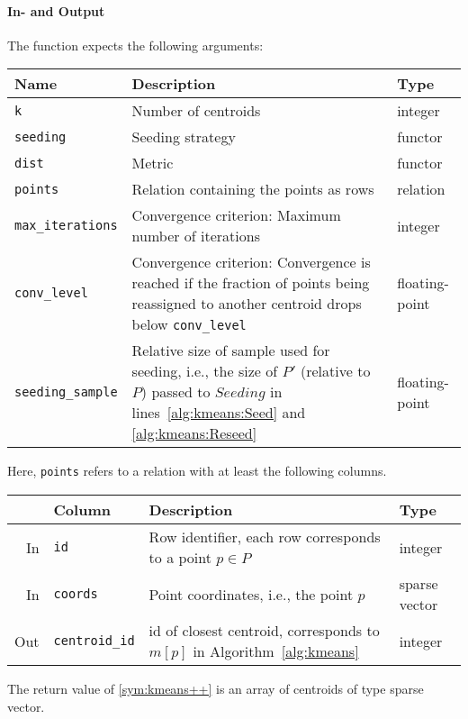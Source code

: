 \documentclass[letterpaper,11pt]{scrreprt}
\numberwithin{equation}{section}
\newcommand{\otoprule}{\midrule[\heavyrulewidth]}
\theoremstyle{algorithm}
\begin{document}
\paragraph{In- and Output} The function expects the following arguments:

\begin{center}
	\begin{tabularx}{\linewidth}{lXl}
		\toprule%
		\textbf{Name} & \textbf{Description} & \textbf{Type}
		\\\otoprule
		\texttt{k} &
		Number of centroids &
		integer
		\\\midrule
		\texttt{seeding} &
		Seeding strategy &
		functor
		\\\midrule
		\texttt{dist} &
		Metric &
		functor
		\\\midrule
		\texttt{points} &
		Relation containing the points as rows &
		relation
		\\\midrule
		\texttt{max\_iterations} &
		Convergence criterion: Maximum number of iterations &
		integer
		\\\midrule
		\texttt{conv\_level} &
		Convergence criterion: Convergence is reached if the fraction of points being reassigned to another centroid drops below \texttt{conv\_level} &
		floating-point
		\\\midrule
		\texttt{seeding\_sample} &
		Relative size of sample used for seeding, i.e., the size of $P'$ (relative to $P$) passed to $\mathit{Seeding}$ in lines~\ref{alg:kmeans:Seed} and \ref{alg:kmeans:Reseed}  &
		floating-point
		\\\bottomrule
	\end{tabularx}
\end{center}
%
Here, \texttt{points} refers to a relation with at least the following columns.
%
\begin{center}
	\begin{tabularx}{\linewidth}{rlXl}
		\toprule%
		& \textbf{Column} & \textbf{Description} & \textbf{Type}
		\\\otoprule
		In &
		\texttt{id} &
		Row identifier, each row corresponds to a point $p \in P$ &
		integer
		\\\midrule
		In &
		\texttt{coords} &
		Point coordinates, i.e., the point $p$ &
		sparse vector
		\\\midrule
		Out &
		\texttt{centroid\_id} &
		id of closest centroid, corresponds to $m[p]$ in Algorithm~\ref{alg:kmeans} &
		integer
		\\\bottomrule
	\end{tabularx}
\end{center}
%
The return value of \ref{sym:kmeans++} is an array of centroids of type sparse vector.
\end{document}
